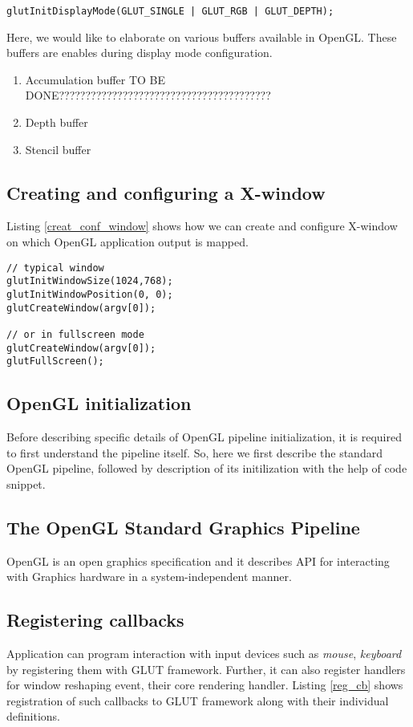 \documentclass{article}
\begin{document}
\begin{lstlisting}[label=glut_display_mode,caption=Initializing OpenGL display mode]
glutInitDisplayMode(GLUT_SINGLE | GLUT_RGB | GLUT_DEPTH);
\end{lstlisting}

Here, we would like to elaborate on various buffers available in OpenGL. These buffers are enables during display mode configuration.
\begin{enumerate}
\item Accumulation buffer
TO BE DONE????????????????????????????????????????     
\item Depth buffer
\item Stencil buffer
\end{enumerate}

\subsection{Creating and configuring a X-window}
Listing \ref{creat_conf_window} shows how we can create and configure X-window on which OpenGL application output is mapped.

\begin{lstlisting}[label=creat_conf_window,caption=Creating and configuring window]
// typical window
glutInitWindowSize(1024,768);
glutInitWindowPosition(0, 0);
glutCreateWindow(argv[0]);

// or in fullscreen mode
glutCreateWindow(argv[0]);
glutFullScreen();
\end{lstlisting}


\subsection{OpenGL initialization}
Before describing specific details of OpenGL pipeline initialization, it is required to first understand the pipeline itself. So, here we first describe the standard OpenGL pipeline, followed by description of its initilization with the help of code snippet.
 
\subsection{The OpenGL Standard Graphics Pipeline}
OpenGL is an open graphics specification and it describes API for interacting with Graphics hardware in a system-independent manner. 




\subsection{Registering callbacks}
Application can program interaction with input devices such as \textit{mouse}, \textit{keyboard} by registering them with GLUT framework. Further, it can also register handlers for window reshaping event, their core rendering handler. Listing \ref{reg_cb} shows registration of such callbacks to GLUT framework along with their individual definitions.
\end{document}
